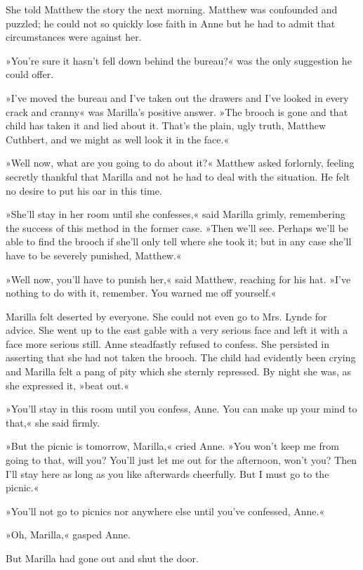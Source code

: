 She told Matthew the story the next morning. Matthew was confounded and puzzled; he could not so quickly lose faith in Anne but he had to admit that circumstances were against her.

»You’re sure it hasn’t fell down behind the bureau?« was the only suggestion he could offer.

»I’ve moved the bureau and I’ve taken out the drawers and I’ve looked in every crack and cranny« was Marilla’s positive answer. »The brooch is gone and that child has taken it and lied about it. That’s the plain, ugly truth, Matthew Cuthbert, and we might as well look it in the face.«

»Well now, what are you going to do about it?« Matthew asked forlornly, feeling secretly thankful that Marilla and not he had to deal with the situation. He felt no desire to put his oar in this time.

»She’ll stay in her room until she confesses,« said Marilla grimly, remembering the success of this method in the former case. »Then we’ll see. Perhaps we’ll be able to find the brooch if she’ll only tell where she took it; but in any case she’ll have to be severely punished, Matthew.«

»Well now, you’ll have to punish her,« said Matthew, reaching for his hat. »I’ve nothing to do with it, remember. You warned me off yourself.«

Marilla felt deserted by everyone. She could not even go to Mrs. Lynde for advice. She went up to the east gable with a very serious face and left it with a face more serious still. Anne steadfastly refused to confess. She persisted in asserting that she had not taken the brooch. The child had evidently been crying and Marilla felt a pang of pity which she sternly repressed. By night she was, as she expressed it, »beat out.«

»You’ll stay in this room until you confess, Anne. You can make up your mind to that,« she said firmly.

»But the picnic is tomorrow, Marilla,« cried Anne. »You won’t keep me from going to that, will you? You’ll just let me out for the afternoon, won’t you? Then I’ll stay here as long as you like afterwards cheerfully. But I must go to the picnic.«

»You’ll not go to picnics nor anywhere else until you’ve confessed, Anne.«

»Oh, Marilla,« gasped Anne.

But Marilla had gone out and shut the door.

